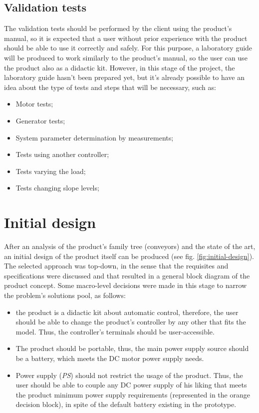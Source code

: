 \documentclass[11pt]{article}
\begin{document}
\subsection{Validation tests}
\label{sec:orgff1a37d}
The validation tests should be performed by the client using the product’s
manual, so it is expected that a user without prior experience with the product
should be able to use it correctly and safely. 
For this purpose, a laboratory guide will be produced to work similarly to the
product’s manual, so the user can use the product also as a didactic kit. However, in this stage of the project, the laboratory guide hasn’t been prepared yet, but it’s already possible to have an idea about the type of tests and steps that will be necessary, such as:
\begin{itemize}
\item Motor tests;
\item Generator tests;
\item System parameter determination by measurements;
\item Tests using another controller;
\item Tests varying the load;
\item Tests changing slope levels;
\end{itemize}

\section{Initial design}
\label{sec:org68fdd80}
After an analysis of the product's family tree (conveyors) and the
state of the art, an initial design of the product itself can be produced (see
fig. \ref{fig:initial-design}). 
The selected approach was top-down, in the sense that the
requisites and specifications were discussed and that resulted in a general
block diagram of the product concept. Some macro-level decisions were made
in this stage to narrow the problem's solutions pool, as follows:
\begin{itemize}
\item the product is a didactic kit about automatic control, therefore, the user
should be able to change the product's controller by any other that fits the
model. Thus, the controller's terminals should be user-accessible.
\item The product should be portable, thus, the main power supply source should be a
battery, which meets the DC motor power supply needs.
\item Power supply (\emph{PS}) should not restrict the usage of the product. Thus, the
user should be able to couple any DC power supply of his liking that meets the
product minimum power supply requirements (represented in the orange decision
block), in spite of the default battery existing in the prototype.
\end{itemize}
\end{document}
